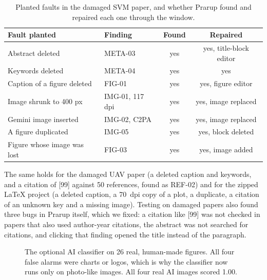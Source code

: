 \documentclass[11pt,a4paper,oneside,openany]{book}
\begin{document}
\begin{table}[htbp]
\centering\small
\caption{Planted faults in the damaged SVM paper, and whether Prarup found and repaired each one through the window.}
\begin{tabularx}{\linewidth}{X l c c}
\toprule
Fault planted & Finding & Found & Repaired\\
\midrule
Abstract deleted & META-03 & yes & yes, title-block editor\\
Keywords deleted & META-04 & yes & yes\\
Caption of a figure deleted & FIG-01 & yes & yes, figure editor\\
Image shrunk to 400 px & IMG-01, 117 dpi & yes & yes, image replaced\\
Gemini image inserted & IMG-02, C2PA & yes & yes, image replaced\\
A figure duplicated & IMG-05 & yes & yes, block deleted\\
Figure whose image was lost & FIG-03 & yes & yes, image added\\
\bottomrule
\end{tabularx}
\end{table}

The same holds for the damaged UAV paper (a deleted caption and keywords, and a citation of [99] against 50
references, found as REF-02) and for the zipped \LaTeX{} project (a deleted caption, a 70~dpi copy of a plot,
a duplicate, a citation of an unknown key and a missing image). Testing on damaged papers also found three
bugs in Prarup itself, which we fixed: a citation like [99] was not checked in papers that also used
author-year citations, the abstract was not searched for citations, and clicking that finding opened the
title instead of the paragraph.

\begin{figure}[htbp]
\centering
{}
\caption{The optional AI classifier on 26 real, human-made figures. All four false alarms were charts or
logos, which is why the classifier now runs only on photo-like images. All four real AI images scored 1.00.}
\end{figure}
\end{document}
